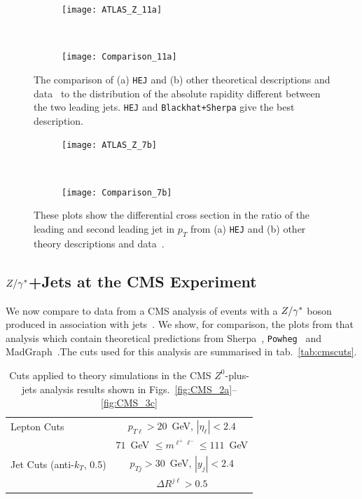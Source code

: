 		\begin{figure}[h]
		  \centering
		  \begin{subfigure}[b]{0.48\textwidth}
		    \texttt{[image: ATLAS\_Z\_11a]}
		    \caption{}
		    \label{fig:HEJ_ATLAS_11a}
		  \end{subfigure}
		  ~
		  \begin{subfigure}[b]{0.48\textwidth}
		    \texttt{[image: Comparison\_11a]}
		    \caption{}
		    \label{fig:MC_ATLAS_11a}
		  \end{subfigure}
		  \caption{The comparison of (a) \texttt{HEJ} and (b) other theoretical descriptions and
		    data~\cite{Aad:2013ysa} to
		    the distribution of the absolute rapidity different between the two leading
		    jets.  \texttt{HEJ} and \texttt{Blackhat+Sherpa} give the best description.}
		  \label{fig:ATLAS_11a}

		  \begin{subfigure}[b]{0.48\textwidth}
		    \texttt{[image: ATLAS\_Z\_7b]}
		    \caption{}
		    \label{fig:HEJ_ATLAS_7b}
		  \end{subfigure}
		  ~
		  \begin{subfigure}[b]{0.48\textwidth}
		    \texttt{[image: Comparison\_7b]}
		    \caption{}
		    \label{fig:MC_ATLAS_7b}
		  \end{subfigure}
		  \caption{These plots show the differential cross section in the ratio of the leading
		     and second leading jet in $p_T$ from (a) \texttt{HEJ} and (b) other
		    theory descriptions and data~\cite{Aad:2013ysa}.}
		  \label{fig:ATLAS_7b}
		\end{figure}

	\subsection{$Z/\gamma^*$+Jets at the CMS Experiment}
		\label{sub:CMS}

		We now compare to data from a CMS analysis of events with a $Z/\gamma^*$ boson produced
		in association with jets~\cite{Khachatryan:2014zya}.  We show, for comparison,
		the plots from that analysis which contain theoretical predictions from
		Sherpa~\cite{Gleisberg:2008ta,Hoeche:2012yf}, \texttt{Powheg}~\cite{Alioli:2010qp} and
		MadGraph~\cite{Alwall:2014hca}.The cuts used for this analysis are summarised in
		tab.~\eqref{tab:cmscuts}.

		\begin{table}[hbt]
		  \centering
		  \begin{tabular}{|l|c|}
		    \hline
		    Lepton Cuts & $p_{T\ell}>20$~GeV, \; $|\eta_\ell|<2.4$ \\
		    &\; $71$~GeV $\leq m^{\ell^+\ell^-} \leq
		      111$~GeV \\ \hline
		    Jet Cuts (anti-$k_T$, 0.5) & $p_{Tj}>30$~GeV, \; $|y_j|<2.4$ \\
		    & $\Delta R^{j\ell} >0.5$ \\
		\hline
		  \end{tabular}
		  \caption{Cuts applied to theory simulations in the CMS
		    $Z^0$-plus-jets analysis results shown in
		    Figs.~\eqref{fig:CMS_2a}--\eqref{fig:CMS_3c}}
		  \label{tab:cmscuts}
		\end{table}

